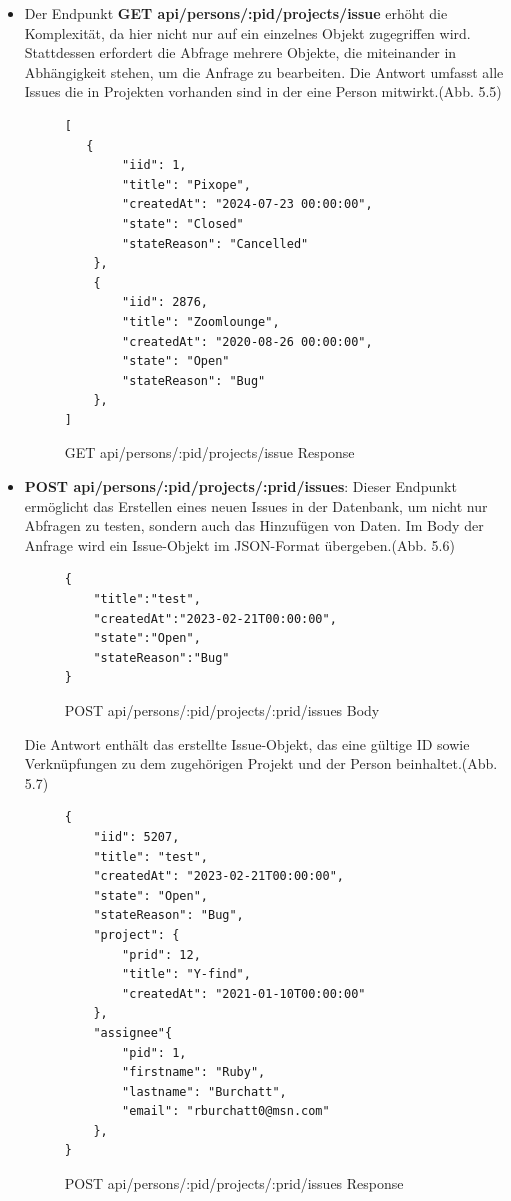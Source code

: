 \begin{itemize}
\item Der Endpunkt \textbf{GET api/persons/:pid/projects/issue} erhöht die Komplexität, da hier nicht nur auf ein einzelnes Objekt zugegriffen wird. Stattdessen erfordert die Abfrage mehrere Objekte, die miteinander in Abhängigkeit stehen, um die Anfrage zu bearbeiten. Die Antwort umfasst alle Issues die in Projekten vorhanden sind in der eine Person mitwirkt.(Abb. 5.5)
\begin{figure}[H]
\begin{center}
\begin{BVerbatim}
[
   {
        "iid": 1,
        "title": "Pixope",
        "createdAt": "2024-07-23 00:00:00",
        "state": "Closed"
        "stateReason": "Cancelled"
    },
    {
        "iid": 2876,
        "title": "Zoomlounge",
        "createdAt": "2020-08-26 00:00:00",
        "state": "Open"
        "stateReason": "Bug"
    },
]
\end{BVerbatim}
\end{center}
\caption{GET api/persons/:pid/projects/issue Response}
\end{figure}

\item \textbf{POST api/persons/:pid/projects/:prid/issues}: Dieser Endpunkt ermöglicht das Erstellen eines neuen Issues in der Datenbank, um nicht nur Abfragen zu testen, sondern auch das Hinzufügen von Daten. Im Body der Anfrage wird ein Issue-Objekt im JSON-Format übergeben.(Abb. 5.6) 
\newline
\begin{figure}[H]
\begin{center}
\begin{BVerbatim}
{
    "title":"test",
    "createdAt":"2023-02-21T00:00:00",
    "state":"Open",
    "stateReason":"Bug"
}
\end{BVerbatim}
\end{center}
\caption{POST api/persons/:pid/projects/:prid/issues Body}
\end{figure}
Die Antwort enthält das erstellte Issue-Objekt, das eine gültige ID sowie Verknüpfungen zu dem zugehörigen Projekt und der Person beinhaltet.(Abb. 5.7)
\begin{figure}[H]
\begin{center}
\begin{BVerbatim}
{
    "iid": 5207,
    "title": "test",
    "createdAt": "2023-02-21T00:00:00",
    "state": "Open",
    "stateReason": "Bug",
    "project": {
        "prid": 12,
        "title": "Y-find",
        "createdAt": "2021-01-10T00:00:00"
    },
    "assignee"{
        "pid": 1,
        "firstname": "Ruby",
        "lastname": "Burchatt",
        "email": "rburchatt0@msn.com"
    },
}
\end{BVerbatim}
\end{center}
\caption{POST api/persons/:pid/projects/:prid/issues Response}
\end{figure}
\end{itemize}

